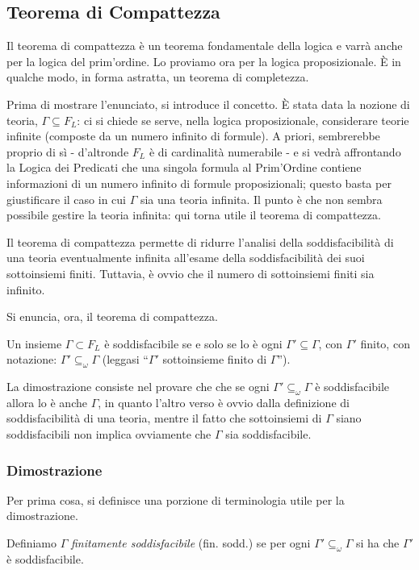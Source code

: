 \subsection{Teorema di Compattezza}
Il teorema di compattezza è un teorema fondamentale della logica e varrà 
anche per la logica del prim'ordine. Lo proviamo ora per la logica proposizionale. 
\`E in qualche modo, in forma astratta, un teorema di completezza. 

Prima di mostrare l'enunciato, si introduce il concetto. \`E stata data la 
nozione di teoria, $\Gamma \subseteq F_L$: ci si chiede se serve, nella logica 
proposizionale, considerare teorie infinite (composte da un numero 
infinito di formule). A priori, sembrerebbe proprio di sì - d'altronde $F_L$ è di 
cardinalità numerabile - e si vedrà affrontando
la Logica dei Predicati che una singola formula al Prim'Ordine contiene informazioni 
di un numero infinito di formule proposizionali; questo basta per giustificare il caso 
in cui $\Gamma$ sia una teoria infinita. Il punto è che non sembra possibile 
gestire la teoria infinita: qui torna utile il teorema di compattezza. 
 

Il teorema di compattezza permette di ridurre l'analisi della soddisfacibilità di 
una teoria eventualmente infinita all'esame della soddisfacibilità dei suoi 
sottoinsiemi finiti. Tuttavia, è ovvio che il numero di sottoinsiemi finiti 
sia infinito. 
\noindent

Si enuncia, ora, il teorema di compattezza.
\begin{teo}[Compattezza]
Un insieme $\Gamma \subset F_L$ è soddisfacibile se e solo se lo è ogni
$\Gamma' \subseteq \Gamma$, con $\Gamma'$ finito, con notazione: $\Gamma' \subseteq_{\omega} \Gamma$ (leggasi 
``$\Gamma '$ sottoinsieme finito di $\Gamma$'').
\end{teo}
La dimostrazione consiste nel 
provare che 
che se ogni $\Gamma ' \subseteq_{\omega} \Gamma$ è 
soddisfacibile allora lo è anche $\Gamma$, in quanto l'altro 
verso è ovvio dalla definizione di soddisfacibilità di una teoria, mentre
il fatto che sottoinsiemi di $\Gamma$ siano soddisfacibili non implica ovviamente 
che $\Gamma$ sia soddisfacibile. 

\subsubsection{Dimostrazione}
Per prima cosa, si definisce una porzione di terminologia utile per la 
dimostrazione. 
\begin{defi}
        Definiamo $\Gamma$ \textit{finitamente soddisfacibile} (fin. sodd.) 
        se per ogni $\Gamma' \subseteq_{\omega} \Gamma$ 
        si ha che $\Gamma'$ è soddisfacibile.
\end{defi}


